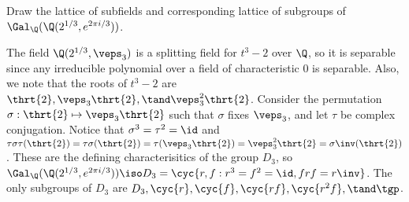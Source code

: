 \documentclass{article}
\begin{document}
\begin{subexercise} \label{qs:fiveb} %
Draw the lattice of subfields and corresponding lattice of subgroups of \\
\( \Gal_\Q(\Q(2^{1/3}, e^{2\pi i / 3})) \).
\end{subexercise}
\begin{solution}
The field \( \Q(2^{1/3}, \veps_3) \) is a splitting field for \( t^3-2 \) over \( \Q \), so it is separable since any irreducible polynomial over a field of characteristic 0 is separable.
Also, we note that the roots of \( t^3-2 \) are \( \thrt{2}, \veps_3\thrt{2}, \tand \veps_3^2\thrt{2} \).
Consider the permutation \( \sigma: \thrt{2}\mapsto \veps_3\thrt{2} \) such that \( \sigma \) fixes \( \veps_3 \), and let \( \tau \) be complex conjugation.
Notice that \( \sigma^3 = \tau^2 = \id \) and \( \tau\sigma\tau(\thrt{2}) = \tau\sigma(\thrt{2}) = \tau(\veps_3\thrt{2}) = \veps_3^2\thrt{2} = \sigma\inv(\thrt{2}) \).
These are the defining characterisitics of the group \( D_3 \), so \( \Gal_\Q(\Q(2^{1/3}, e^{2\pi i / 3})) \iso D_3 = \cyc{r,f : r^3 = f^2 = \id, frf = r\inv}\).
The only subgroups of \( D_3 \) are \( D_3,\cyc{r}, \cyc{f}, \cyc{rf}, \cyc{r^2f}, \tand\tgp \).
\end{solution}
\end{document}
